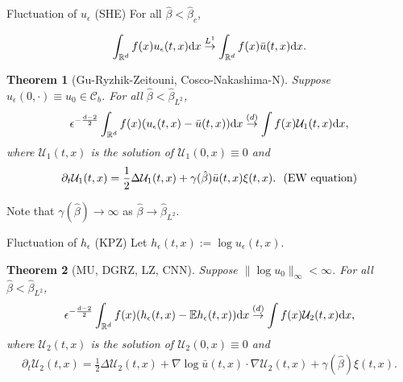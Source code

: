 \documentclass[10pt]{beamer}
\newtheorem{thm}{Theorem}
\newcommand{\R}{\mathbb{R}}
\newcommand{\E}{\mathbb{E}}
\newcommand{\e}{\epsilon}
\def\al#1{\begin{align*}#1\end{align*}}
\begin{document}
\begin{frame}{Fluctuation of $u_{\epsilon}$ (SHE)}
  For all $\hat{\beta}<\hat{\beta}_c$,
  
   \vspace{-6mm}
      \al{ \int_{\R^d} f(x) u_{\epsilon}(t,x){\rm d} x\overset{L^1}{\rightarrow}      \int_{\R^d} f(x) \bar{u}(t,x){\rm d} x.
      }
      \vspace{-4mm}
      \begin{thm}[Gu-Ryzhik-Zeitouni, Cosco-Nakashima-N]
        Suppose $u_{\epsilon}(0,\cdot)\equiv u_0\in \mathcal{C}_b$. For all $\hat{\beta}<\hat{\beta}_{L^2}$,
        $$\e^{-\frac{d-2}{2}}\int_{\R^d} f(x) (u_{\epsilon}(t,x)-\bar{u}(t,x)){\rm d} x\overset{(d)}{\rightarrow} \int f(x) \mathcal{U}_1(t,x){\rm d} x, $$
        where $\mathcal{U}_1(t,x)$ is the solution of $\mathcal{U}_1(0,x)\equiv 0$ and
        \al{
        \partial_t  \mathcal{U}_1(t,x)=\frac{1}{2}\Delta \mathcal{U}_1(t,x)+\gamma(\hat{\beta})\bar{u}(t,x)\xi(t,x).\text{ \,\,(EW equation)}
          }
        \end{thm}
        Note that $\gamma(\hat{\beta})\to \infty$ as $\hat{\beta}\to \hat{\beta}_{L^2}$.
  \end{frame}

\begin{frame}{Fluctuation of $h_{\epsilon}$ (KPZ)}
 Let $h_{\epsilon}(t,x):=\log{u_{\epsilon}(t,x)}$.
      \begin{thm}[MU, DGRZ, LZ, CNN]
        Suppose  $\|\log{u_0}\|_\infty<\infty$. For all $\hat{\beta}<\hat{\beta}_{L^2}$,
        $$\e^{-\frac{d-2}{2}}\int_{\R^d} f(x) (h_{\epsilon}(t,x)-\E h_{\epsilon}(t,x)){\rm d} x\overset{(d)}{\rightarrow} \int f(x) \mathcal{U}_2(t,x){\rm d} x, $$
        where $\mathcal{U}_2(t,x)$ is the solution of $\mathcal{U}_2(0,x)\equiv 0$ and
        \al{
        \partial_t  \mathcal{U}_2(t,x)=\frac{1}{2}\Delta \mathcal{U}_2(t,x)+\nabla\log{\bar{u}(t,x)}\cdot \nabla \mathcal{U}_2(t,x) + \gamma(\hat{\beta})\xi(t,x).
          }
        \end{thm}
\end{frame}
\end{document}
